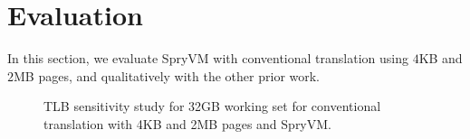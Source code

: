 \section{Evaluation}
\label{sec:evalation}

In this section, we evaluate SpryVM with conventional translation using $4$KB and $2$MB pages, and qualitatively with the other prior work.   

\begin{figure}[t]
	\centering
	\hspace{.01in}

	
	\caption{TLB sensitivity study for 32GB working set for conventional translation with 4KB and 2MB pages and SpryVM.
		\label{fig:miss_ratio_32GB}}
\end{figure}

